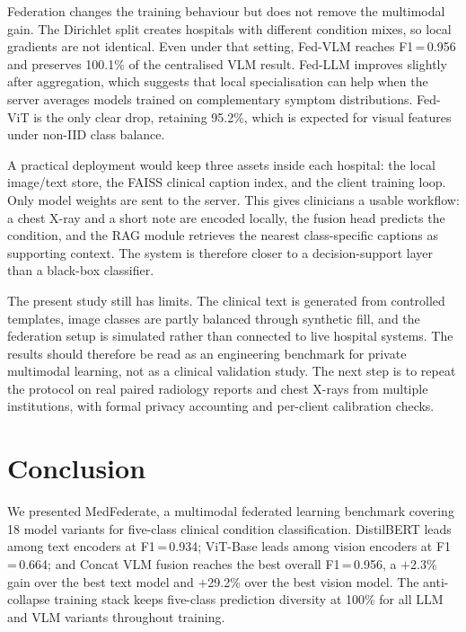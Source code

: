 \documentclass[conference]{IEEEtran}
\begin{document}
Federation changes the training behaviour but does not remove the
multimodal gain. The Dirichlet split creates hospitals with different
condition mixes, so local gradients are not identical. Even under that
setting, Fed-VLM reaches F1\,=\,0.956 and preserves 100.1\% of the
centralised VLM result. Fed-LLM improves slightly after aggregation,
which suggests that local specialisation can help when the server averages
models trained on complementary symptom distributions. Fed-ViT is the only
clear drop, retaining 95.2\%, which is expected for visual features under
non-IID class balance.

A practical deployment would keep three assets inside each hospital: the
local image/text store, the FAISS clinical caption index, and the client
training loop. Only model weights are sent to the server. This gives
clinicians a usable workflow: a chest X-ray and a short note are encoded
locally, the fusion head predicts the condition, and the RAG module
retrieves the nearest class-specific captions as supporting context. The
system is therefore closer to a decision-support layer than a black-box
classifier.

The present study still has limits. The clinical text is generated from
controlled templates, image classes are partly balanced through synthetic
fill, and the federation setup is simulated rather than connected to live
hospital systems. The results should therefore be read as an engineering
benchmark for private multimodal learning, not as a clinical validation
study. The next step is to repeat the protocol on real paired radiology
reports and chest X-rays from multiple institutions, with formal privacy
accounting and per-client calibration checks.

\section{Conclusion}

We presented MedFederate, a multimodal federated learning benchmark
covering 18 model variants for five-class clinical condition
classification. DistilBERT leads among text encoders at F1\,=\,0.934;
ViT-Base leads among vision encoders at F1\,=\,0.664; and Concat VLM
fusion reaches the best overall F1\,=\,0.956, a $+$2.3\% gain over
the best text model and $+$29.2\% over the best vision model. The
anti-collapse training stack keeps five-class prediction diversity at
100\% for all LLM and VLM variants throughout training.
\end{document}
